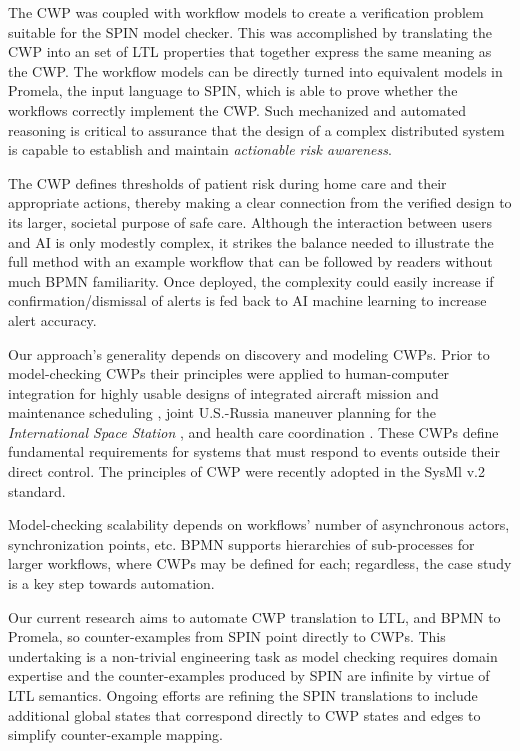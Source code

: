 The CWP was coupled with workflow models to create a verification problem suitable for the SPIN model checker. This was accomplished by translating the CWP into an set of LTL properties that together express the same meaning as the CWP. The workflow models can be directly turned into equivalent models in Promela, the input language to SPIN, which is able to prove whether the workflows correctly implement the CWP. Such mechanized and automated reasoning is critical to assurance that the design of a complex distributed system is capable to establish and maintain \emph{actionable risk awareness}. 

The CWP defines thresholds of patient risk during home care and their appropriate actions, thereby making a clear connection from the verified design to its larger, societal purpose of safe care. Although the interaction between users and AI is only modestly complex, it strikes the balance needed to illustrate the full method with an example workflow that can be followed by readers without much BPMN familiarity. 
Once deployed, the complexity could easily increase if confirmation/dismissal of alerts is fed back to AI machine learning to increase alert accuracy.

Our approach's generality depends on discovery and modeling CWPs. Prior to model-checking CWPs their principles  were applied to human-computer integration for highly usable designs of integrated aircraft mission and maintenance scheduling \cite{workcentered}, joint U.S.-Russia maneuver planning for the \emph{International Space Station}  \cite{10.1145/1978942.1979311}, and health care coordination \cite{BERRY201615}. These CWPs define fundamental requirements for systems that must respond to events outside their direct control. The principles of CWP were recently adopted in the SysMl v.2 standard.

Model-checking scalability depends on workflows' number of asynchronous actors, synchronization points, etc. BPMN supports hierarchies of sub-processes for larger workflows, where CWPs may be defined for each; regardless, the case study is a key step towards automation. 

Our current research aims to automate CWP translation to LTL, and BPMN to Promela, so counter-examples from SPIN point directly to CWPs. This undertaking is a non-trivial engineering task as model checking requires domain expertise and the counter-examples produced by SPIN are infinite by virtue of LTL semantics. Ongoing efforts are refining the SPIN translations to include additional global states that correspond directly to CWP states and edges to simplify counter-example mapping. 


